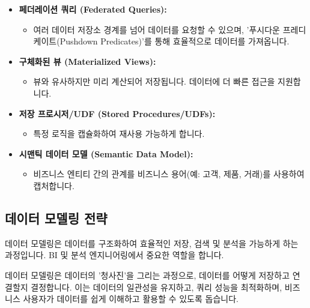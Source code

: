 \documentclass[11pt,a4paper]{article}
\theoremstyle{definition}
\begin{document}
\begin{itemize}
    \item \textbf{페더레이션 쿼리 (Federated Queries):}
    \begin{itemize}
        \item 여러 데이터 저장소 경계를 넘어 데이터를 요청할 수 있으며, '푸시다운 프레디케이트(Pushdown Predicates)'를 통해 효율적으로 데이터를 가져옵니다.
    \end{itemize}
    \item \textbf{구체화된 뷰 (Materialized Views):}
    \begin{itemize}
        \item 뷰와 유사하지만 미리 계산되어 저장됩니다. 데이터에 더 빠른 접근을 지원합니다.
    \end{itemize}
    \item \textbf{저장 프로시저/UDF (Stored Procedures/UDFs):}
    \begin{itemize}
        \item 특정 로직을 캡슐화하여 재사용 가능하게 합니다.
    \end{itemize}
    \item \textbf{시맨틱 데이터 모델 (Semantic Data Model):}
    \begin{itemize}
        \item 비즈니스 엔티티 간의 관계를 비즈니스 용어(예: 고객, 제품, 거래)를 사용하여 캡처합니다.
    \end{itemize}
\end{itemize}

\subsection{데이터 모델링 전략}
데이터 모델링은 데이터를 구조화하여 효율적인 저장, 검색 및 분석을 가능하게 하는 과정입니다. BI 및 분석 엔지니어링에서 중요한 역할을 합니다.

\begin{summarybox}[title=핵심 요약: 데이터의 청사진]
데이터 모델링은 데이터의 '청사진'을 그리는 과정으로, 데이터를 어떻게 저장하고 연결할지 결정합니다. 이는 데이터의 일관성을 유지하고, 쿼리 성능을 최적화하며, 비즈니스 사용자가 데이터를 쉽게 이해하고 활용할 수 있도록 돕습니다.
\end{summarybox}
\end{document}
